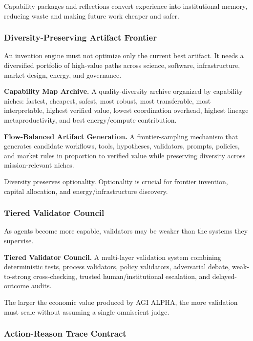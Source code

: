\documentclass[11pt]{article}
\begin{document}
Capability packages and reflections convert experience into institutional memory, reducing waste and making future work cheaper and safer.

\subsubsection{Diversity-Preserving Artifact Frontier}\label{diversity-preserving-artifact-frontier}

An invention engine must not optimize only the current best artifact. It needs a diversified portfolio of high-value paths across science, software, infrastructure, market design, energy, and governance.

\textbf{Capability Map Archive.} A quality-diversity archive organized by capability niches: fastest, cheapest, safest, most robust, most transferable, most interpretable, highest verified value, lowest coordination overhead, highest lineage metaproductivity, and best energy/compute contribution.

\textbf{Flow-Balanced Artifact Generation.} A frontier-sampling mechanism that generates candidate workflows, tools, hypotheses, validators, prompts, policies, and market rules in proportion to verified value while preserving diversity across mission-relevant niches.

Diversity preserves optionality. Optionality is crucial for frontier invention, capital allocation, and energy/infrastructure discovery.

\subsubsection{Tiered Validator Council}\label{tiered-validator-council}

As agents become more capable, validators may be weaker than the systems they supervise.

\textbf{Tiered Validator Council.} A multi-layer validation system combining deterministic tests, process validators, policy validators, adversarial debate, weak-to-strong cross-checking, trusted human/institutional escalation, and delayed-outcome audits.

The larger the economic value produced by AGI ALPHA, the more validation must scale without assuming a single omniscient judge.

\subsubsection{Action-Reason Trace Contract}\label{action-reason-trace-contract}
\end{document}
